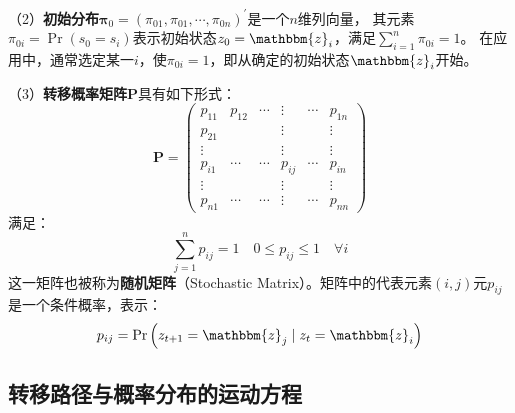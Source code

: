 （2）\textbf{初始分布}$\boldsymbol{\pi}_0=\left(\pi_{01},\pi_{01},\cdots,\pi_{0n}\right)^{\prime}$是一个$n$维列向量，
其元素$\pi_{0i}=\operatorname{Pr}\left(s_0=s_i\right)$表示初始状态$z_0=\mathbbm{z}_i$，满足$\sum_{i=1}^{n}\pi_{0i}=1$。
在应用中，通常选定某一$i$，使$\pi_{0i}=1$，即从确定的初始状态$\mathbbm{z}_i$开始。

（3）\textbf{转移概率矩阵}$\boldsymbol{P}$具有如下形式：
\begin{equation*}
    \boldsymbol{P}=\left(\begin{array}{cccccc}
        p_{11} & p_{12} & \cdots & \vdots & \cdots & p_{1 n} \\
        p_{21} & & & \vdots & & \vdots \\
        \vdots & & & \vdots & & \vdots \\
        p_{i 1} & \cdots & \cdots & p_{i j} & \cdots & p_{i n} \\
        \vdots & & & \vdots & & \vdots \\
        p_{n 1} & \cdots & \cdots & \vdots & \cdots & p_{n n}
        \end{array}\right)
\end{equation*}
满足：
\begin{equation*}   
    \sum_{j=1}^{n}p_{ij}=1 \quad 0\leq p_{ij}\leq 1 \quad \forall i
\end{equation*}
这一矩阵也被称为\textbf{随机矩阵}（Stochastic Matrix）。矩阵中的代表元素$\left(i,j\right)$元$p_{ij}$是一个条件概率，表示：
\begin{equation*}
    p_{ij}=\operatorname{Pr}\left(z_{t+1}=\mathbbm{z}_j\mid z_t = \mathbbm{z}_i\right)
\end{equation*}


\subsection{转移路径与概率分布的运动方程}

